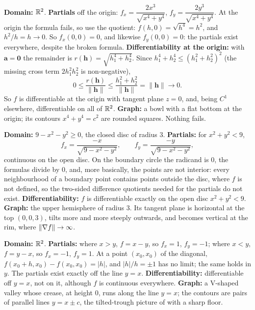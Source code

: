 \begin{solutions}
  \item \textbf{Domain:} $\mathbb{R}^{2}$. \textbf{Partials} off the origin:
        $f_{x}=\dfrac{2x^{3}}{\sqrt{x^{4}+y^{4}}}$,
        $f_{y}=\dfrac{2y^{3}}{\sqrt{x^{4}+y^{4}}}$. At the origin the
        formula fails, so use the quotient:
        $f(h,0)=\sqrt{h^{4}}=h^{2}$, and $h^{2}/h=h\to0$. So
        $f_{x}(0,0)=0$, and likewise $f_{y}(0,0)=0$: the partials exist
        everywhere, despite the broken formula. \textbf{Differentiability
        at the origin:} with $\mathbf{a}=\mathbf{0}$ the remainder is
        $r(\mathbf{h})=\sqrt{h_{1}^{4}+h_{2}^{4}}$. Since
        $h_{1}^{4}+h_{2}^{4}\le(h_{1}^{2}+h_{2}^{2})^{2}$ (the missing
        cross term $2h_{1}^{2}h_{2}^{2}$ is non-negative),
        \[
          0\le\frac{r(\mathbf{h})}{\|\mathbf{h}\|}
          \le\frac{h_{1}^{2}+h_{2}^{2}}{\|\mathbf{h}\|}=\|\mathbf{h}\|\to0 .
        \]
        So $f$ is differentiable at the origin with tangent plane $z=0$,
        and, being $C^{1}$ elsewhere, differentiable on all of $\mathbb{R}^{2}$.
        \textbf{Graph:} a bowl with a flat bottom at the origin; its
        contours $x^{4}+y^{4}=c^{2}$ are rounded squares. Nothing fails.

  \item \textbf{Domain:} $9-x^{2}-y^{2}\ge0$, the closed disc of radius $3$.
        \textbf{Partials:} for $x^{2}+y^{2}<9$,
        \[
          f_{x}=\frac{-x}{\sqrt{9-x^{2}-y^{2}}},\qquad
          f_{y}=\frac{-y}{\sqrt{9-x^{2}-y^{2}}},
        \]
        continuous on the open disc. On the boundary circle the radicand
        is $0$, the formulas divide by $0$, and, more basically, the points
        are not interior: every neighbourhood of a boundary point contains
        points outside the disc, where $f$ is not defined, so the two-sided
        difference quotients needed for the partials do not exist. \textbf{Differentiability:}
        $f$ is differentiable exactly on the open disc $x^{2}+y^{2}<9$.
        \textbf{Graph:} the upper hemisphere of radius $3$. Its tangent
        plane is horizontal at the top $(0,0,3)$, tilts more and more
        steeply outwards, and becomes vertical at the rim, where
        $\|\nabla f\|\to\infty$.

  \item \textbf{Domain:} $\mathbb{R}^{2}$. \textbf{Partials:} where $x>y$,
        $f=x-y$, so $f_{x}=1$, $f_{y}=-1$; where $x<y$, $f=y-x$, so
        $f_{x}=-1$, $f_{y}=1$. At a point $(x_{0},x_{0})$ of the diagonal,
        $f(x_{0}+h,x_{0})-f(x_{0},x_{0})=|h|$, and $|h|/h=\pm1$ has no limit;
        the same holds in $y$. The partials exist exactly off the line
        $y=x$. \textbf{Differentiability:} differentiable off $y=x$, not on
        it, although $f$ is continuous everywhere. \textbf{Graph:} a
        V-shaped valley whose crease, at height $0$, runs along the line
        $y=x$; the contours are pairs of parallel lines $y=x\pm c$, the
        tilted-trough picture of  with a sharp floor.


\end{solutions}
